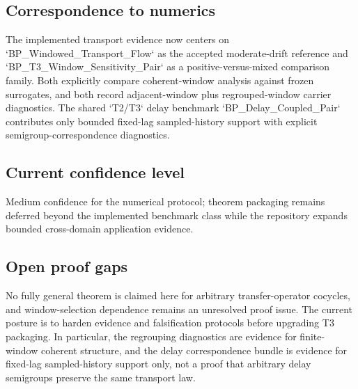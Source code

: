 \subsection{Correspondence to numerics}
The implemented transport evidence now centers on `BP_Windowed_Transport_Flow` as the accepted moderate-drift reference and `BP_T3_Window_Sensitivity_Pair` as a positive-versus-mixed comparison family. Both explicitly compare coherent-window analysis against frozen surrogates, and both record adjacent-window plus regrouped-window carrier diagnostics. The shared `T2/T3` delay benchmark `BP_Delay_Coupled_Pair` contributes only bounded fixed-lag sampled-history support with explicit semigroup-correspondence diagnostics.

\subsection{Current confidence level}
Medium confidence for the numerical protocol; theorem packaging remains deferred beyond the implemented benchmark class while the repository expands bounded cross-domain application evidence.

\subsection{Open proof gaps}
No fully general theorem is claimed here for arbitrary transfer-operator cocycles, and window-selection dependence remains an unresolved proof issue. The current posture is to harden evidence and falsification protocols before upgrading T3 packaging. In particular, the regrouping diagnostics are evidence for finite-window coherent structure, and the delay correspondence bundle is evidence for fixed-lag sampled-history support only, not a proof that arbitrary delay semigroups preserve the same transport law.
